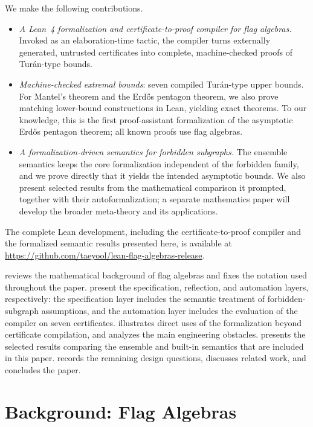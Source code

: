 \documentclass[acmsmall,screen=true,acmthm=false]{acmart}
\newcommand{\boldparagraph}[1]{\noindentparagraph{\textnormal{\textbf{#1}}}}
\begin{document}
\boldparagraph{Contributions.}
We make the following contributions.
\begin{itemize}
\item \emph{A Lean~4 formalization and certificate-to-proof compiler for flag
  algebras.}  Invoked as an elaboration-time tactic, the compiler turns
  externally generated, untrusted certificates into complete,
  machine-checked proofs of Tur\'an-type bounds.
\item \emph{Machine-checked extremal bounds}: seven compiled Tur\'an-type upper
  bounds.  For Mantel's theorem and the Erd\H{o}s pentagon theorem, we also
  prove matching lower-bound constructions in Lean, yielding exact theorems.
  To our knowledge, this is the first proof-assistant formalization of the
  asymptotic Erd\H{o}s pentagon theorem; all known proofs use flag algebras.
\item \emph{A formalization-driven semantics for forbidden subgraphs.}  The
  ensemble semantics keeps the core formalization independent of the forbidden
  family, and we prove directly that it yields the intended asymptotic bounds.
  We also present selected results from the
  mathematical comparison it prompted, together with their autoformalization;
  a separate mathematics paper will develop the broader meta-theory and its
  applications.
\end{itemize}
The complete Lean development, including the certificate-to-proof compiler
and the formalized semantic results presented here, is  available at
\url{https://github.com/taeyool/lean-flag-algebras-release}.

\boldparagraph{Organization.}
 reviews the mathematical background of flag algebras
and fixes the notation used throughout the paper.
 present the specification,
reflection, and automation layers, respectively: the specification layer
includes the semantic treatment of forbidden-subgraph assumptions, and the
automation layer includes the evaluation of the compiler on seven certificates.
 illustrates direct uses of the formalization beyond
certificate compilation, and  analyzes the main engineering
obstacles.   presents the selected results comparing the
ensemble and built-in semantics that are included in this paper.
 records the remaining design questions,
 discusses related work, and  concludes
the paper.

\section{Background: Flag Algebras}
\label{sec:background}
\end{document}
